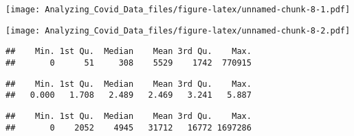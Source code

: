 \documentclass[
]{article}
\newenvironment{Shaded}{\begin{snugshade}}{\end{snugshade}}
\newcommand{\ConstantTok}[1]{\textcolor[rgb]{0.56,0.35,0.01}{#1}}
\newcommand{\FunctionTok}[1]{\textcolor[rgb]{0.13,0.29,0.53}{\textbf{#1}}}
\newcommand{\NormalTok}[1]{#1}
\newcommand{\SpecialCharTok}[1]{\textcolor[rgb]{0.81,0.36,0.00}{\textbf{#1}}}
\newcommand{\StringTok}[1]{\textcolor[rgb]{0.31,0.60,0.02}{#1}}
\begin{document}
\texttt{[image: Analyzing\_Covid\_Data\_files/figure-latex/unnamed-chunk-8-1.pdf]}

\begin{Shaded}
\end{Shaded}

\texttt{[image: Analyzing\_Covid\_Data\_files/figure-latex/unnamed-chunk-8-2.pdf]}

\begin{Shaded}
\end{Shaded}

\begin{verbatim}
##    Min. 1st Qu.  Median    Mean 3rd Qu.    Max. 
##       0      51     308    5529    1742  770915
\end{verbatim}

\begin{Shaded}
\end{Shaded}

\begin{verbatim}
##    Min. 1st Qu.  Median    Mean 3rd Qu.    Max. 
##   0.000   1.708   2.489   2.469   3.241   5.887
\end{verbatim}

\begin{Shaded}
\end{Shaded}

\begin{verbatim}
##    Min. 1st Qu.  Median    Mean 3rd Qu.    Max. 
##       0    2052    4945   31712   16772 1697286
\end{verbatim}
\end{document}
